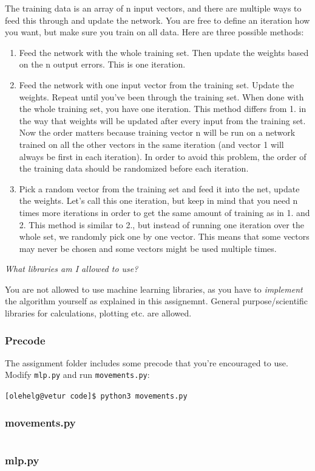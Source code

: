 \documentclass{article}           %
\begin{document}
The training data is an array of n input vectors,
and there are multiple ways to feed this through and update the network.
You are free to define an iteration how you want,
but make sure you train on all data.
Here are three possible methods:
\begin{enumerate}

    \item   Feed the network with the whole training set.
            Then update the weights based on the n output errors.
            This is one iteration.

    \item   Feed the network with one input vector from the training set.
            Update the weights.
            Repeat until you’ve been through the training set.
            When done with the whole training set, you have one iteration.
            This method differs from 1. in the way that weights will be updated after every input from the training set.
            Now the order matters because training vector n will be run on a network trained on all the other vectors in the same iteration (and vector 1 will always be first in each iteration).
            In order to avoid this problem, the order of the training data should be randomized before each iteration.

    \item   Pick a random vector from the training set and feed it into the net, update the weights.
            Let’s call this one iteration, but keep in mind that you need n times more iterations in order to get the same amount of training as in 1. and 2.
            This method is similar to 2., but instead of running one iteration over the whole set,
            we randomly pick one by one vector.
            This means that some vectors may never be chosen and some vectors might be used multiple times.

\end{enumerate}

\noindent
\textit{What libraries am I allowed to use?}

You are not allowed to use machine learning libraries,
as you have to \emph{implement} the algorithm yourself as explained in this assignemnt.
General purpose/scientific libraries for calculations, plotting etc. are allowed.

\subsubsection*{Precode}
The assignment folder includes some precode that you're encouraged to use.
Modify \texttt{mlp.py} and run \texttt{movements.py}:
\begin{center}
    \texttt{[olehelg@vetur code]\$ python3 movements.py}
\end{center}

\subsubsection*{movements.py}
\inputminted{Python}{./code/movements.py}

\subsubsection*{mlp.py}
\inputminted{Python}{./code/mlp.py}


\end{document}
